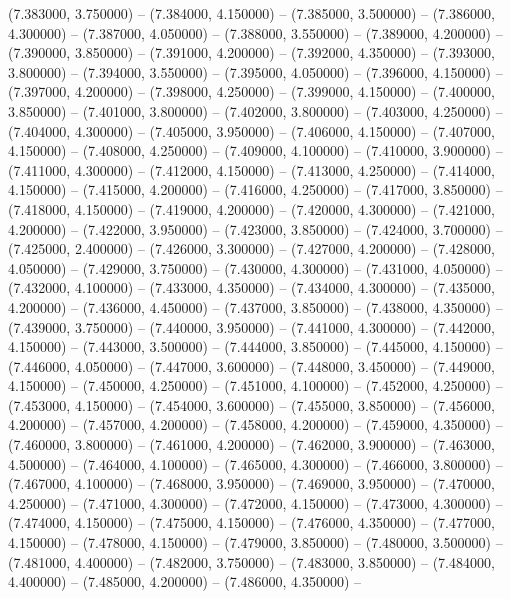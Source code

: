(7.383000, 3.750000) -- 
(7.384000, 4.150000) -- 
(7.385000, 3.500000) -- 
(7.386000, 4.300000) -- 
(7.387000, 4.050000) -- 
(7.388000, 3.550000) -- 
(7.389000, 4.200000) -- 
(7.390000, 3.850000) -- 
(7.391000, 4.200000) -- 
(7.392000, 4.350000) -- 
(7.393000, 3.800000) -- 
(7.394000, 3.550000) -- 
(7.395000, 4.050000) -- 
(7.396000, 4.150000) -- 
(7.397000, 4.200000) -- 
(7.398000, 4.250000) -- 
(7.399000, 4.150000) -- 
(7.400000, 3.850000) -- 
(7.401000, 3.800000) -- 
(7.402000, 3.800000) -- 
(7.403000, 4.250000) -- 
(7.404000, 4.300000) -- 
(7.405000, 3.950000) -- 
(7.406000, 4.150000) -- 
(7.407000, 4.150000) -- 
(7.408000, 4.250000) -- 
(7.409000, 4.100000) -- 
(7.410000, 3.900000) -- 
(7.411000, 4.300000) -- 
(7.412000, 4.150000) -- 
(7.413000, 4.250000) -- 
(7.414000, 4.150000) -- 
(7.415000, 4.200000) -- 
(7.416000, 4.250000) -- 
(7.417000, 3.850000) -- 
(7.418000, 4.150000) -- 
(7.419000, 4.200000) -- 
(7.420000, 4.300000) -- 
(7.421000, 4.200000) -- 
(7.422000, 3.950000) -- 
(7.423000, 3.850000) -- 
(7.424000, 3.700000) -- 
(7.425000, 2.400000) -- 
(7.426000, 3.300000) -- 
(7.427000, 4.200000) -- 
(7.428000, 4.050000) -- 
(7.429000, 3.750000) -- 
(7.430000, 4.300000) -- 
(7.431000, 4.050000) -- 
(7.432000, 4.100000) -- 
(7.433000, 4.350000) -- 
(7.434000, 4.300000) -- 
(7.435000, 4.200000) -- 
(7.436000, 4.450000) -- 
(7.437000, 3.850000) -- 
(7.438000, 4.350000) -- 
(7.439000, 3.750000) -- 
(7.440000, 3.950000) -- 
(7.441000, 4.300000) -- 
(7.442000, 4.150000) -- 
(7.443000, 3.500000) -- 
(7.444000, 3.850000) -- 
(7.445000, 4.150000) -- 
(7.446000, 4.050000) -- 
(7.447000, 3.600000) -- 
(7.448000, 3.450000) -- 
(7.449000, 4.150000) -- 
(7.450000, 4.250000) -- 
(7.451000, 4.100000) -- 
(7.452000, 4.250000) -- 
(7.453000, 4.150000) -- 
(7.454000, 3.600000) -- 
(7.455000, 3.850000) -- 
(7.456000, 4.200000) -- 
(7.457000, 4.200000) -- 
(7.458000, 4.200000) -- 
(7.459000, 4.350000) -- 
(7.460000, 3.800000) -- 
(7.461000, 4.200000) -- 
(7.462000, 3.900000) -- 
(7.463000, 4.500000) -- 
(7.464000, 4.100000) -- 
(7.465000, 4.300000) -- 
(7.466000, 3.800000) -- 
(7.467000, 4.100000) -- 
(7.468000, 3.950000) -- 
(7.469000, 3.950000) -- 
(7.470000, 4.250000) -- 
(7.471000, 4.300000) -- 
(7.472000, 4.150000) -- 
(7.473000, 4.300000) -- 
(7.474000, 4.150000) -- 
(7.475000, 4.150000) -- 
(7.476000, 4.350000) -- 
(7.477000, 4.150000) -- 
(7.478000, 4.150000) -- 
(7.479000, 3.850000) -- 
(7.480000, 3.500000) -- 
(7.481000, 4.400000) -- 
(7.482000, 3.750000) -- 
(7.483000, 3.850000) -- 
(7.484000, 4.400000) -- 
(7.485000, 4.200000) -- 
(7.486000, 4.350000) -- 
